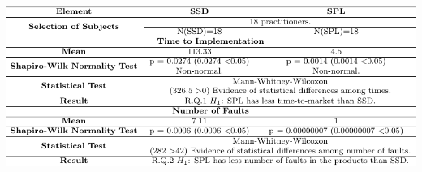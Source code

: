 \begin{table}[!ht]
\caption{\label{tab:resul_s}SSD and SPL Normality and Statistical Tests Results.}
\centering
\includegraphics[scale=0.96]{figures/section3/figtab.pdf}


\end{table}
